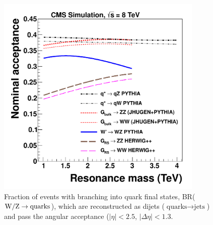 
\begin{figure}[htb]
\begin{center}
\includegraphics[width=0.88\textwidth]{EXO-12-024/figs/signal-acc-eff/all-signal-acc-8TeV.pdf}
\end{center}
\caption{Fraction of events with branching into quark final states, BR(${\rm W}/{\rm Z} \to \text{quarks}$),
  which are reconstructed as dijets ($\text{quarks} \to \text{jets}$)
  and pass the angular acceptance ($|\eta| < 2.5$, $|\Delta\eta|<1.3$.}
\label{fig:acceptances}
\end{figure}

